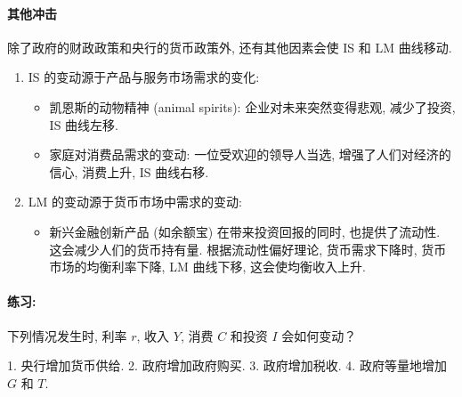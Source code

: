 \documentclass[]{ctexart}
\begin{document}
\paragraph{其他冲击}

除了政府的财政政策和央行的货币政策外,  还有其他因素会使 IS 和 LM
曲线移动. 



\begin{enumerate}
\def\labelenumi{\arabic{enumi}.}
\item
  IS 的变动源于产品与服务市场需求的变化: 

  \begin{itemize}
  \item
    凯恩斯的动物精神 (animal spirits): 
    企业对未来突然变得悲观,  减少了投资,  IS 曲线左移. 
  \item
    家庭对消费品需求的变动: 
    一位受欢迎的领导人当选,  增强了人们对经济的信心,  消费上升,  IS
    曲线右移. 
  \end{itemize}
\item
  LM 的变动源于货币市场中需求的变动: 
  \begin{itemize}
  \item
    新兴金融创新产品 (如余额宝) 在带来投资回报的同时,   也提供了流动性. 这会减少人们的货币持有量. 根据流动性偏好理论,  货币需求下降时,  货币市场的均衡利率下降,  LM
    曲线下移,  这会使均衡收入上升. 
  \end{itemize}
\end{enumerate}

\paragraph{练习: }下列情况发生时,  
利率 $r$,   收入 $Y$,   消费 $C$ 和投资 $I$ 会如何变动？

1. 央行增加货币供给. 
2. 政府增加政府购买.
3. 政府增加税收.
4. 政府等量地增加 $G$ 和 $T$.
\end{document}
